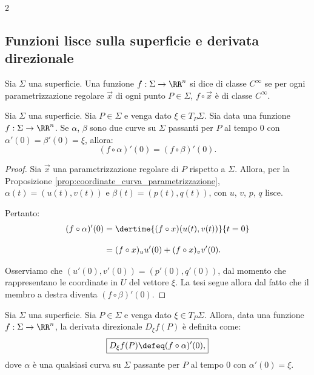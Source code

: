 \begin{multicols*}{2}
    \subsection{Funzioni lisce sulla superficie e derivata direzionale}

    \begin{definition}
        Sia $\Sigma$ una superficie. Una funzione $f : \Sigma \to \RR^n$ si
        dice di classe $C^\infty$ se per ogni parametrizzazione regolare
        $\vec{x}$ di ogni punto $P \in \Sigma$, $f \circ \vec{x}$ è di
        classe $C^\infty$.
    \end{definition}

    \begin{proposition}
        Sia $\Sigma$ una superficie. Sia $P \in \Sigma$ e venga dato
        $\xi \in T_P \Sigma$. Sia data una funzione $f : \Sigma \to \RR^n$.
        Se $\alpha$, $\beta$ sono due curve su $\Sigma$
        passanti per $P$ al tempo $0$ con $\alpha'(0) = \beta'(0) = \xi$, allora:
        \[
            (f \circ \alpha)'(0) = (f \circ \beta)'(0).
        \]
    \end{proposition}

    \begin{proof}
        Sia $\vec{x}$ una parametrizzazione regolare di $P$ rispetto a $\Sigma$.
        Allora, per la Proposizione \ref{prop:coordinate_curva_parametrizzazione},
        $\alpha(t) = (u(t), v(t))$ e $\beta(t) = (p(t), q(t))$, con $u$, $v$, $p$, $q$ lisce. \smallskip

        Pertanto:
        \[
            \begin{aligned}
                (f \circ \alpha)'(0) & = \dertime{(f \circ x)(u(t), v(t))}{t=0}     \\[1em]
                                     & = (f \circ x)_u u'(0) + (f \circ x)_v v'(0).
            \end{aligned}
        \]

        Osserviamo che $(u'(0), v'(0)) = (p'(0), q'(0))$, dal momento che rappresentano le coordinate
        in $U$ del vettore $\xi$.
        La tesi segue allora dal fatto
        che il membro a destra diventa $(f \circ \beta)'(0)$.
    \end{proof}

    \begin{definition}
        Sia $\Sigma$ una superficie. Sia $P \in \Sigma$ e venga dato
        $\xi \in T_P \Sigma$. Allora, data una funzione $f : \Sigma \to \RR^n$,
        la derivata direzionale $D_\xi f(P)$ è definita come:
        \[
            \boxed{D_\xi f(P) \defeq (f \circ \alpha)'(0),}
        \]
        dove $\alpha$ è una qualsiasi curva su $\Sigma$
        passante per $P$ al tempo $0$ con $\alpha'(0) = \xi$.
    \end{definition}


\end{multicols*}
